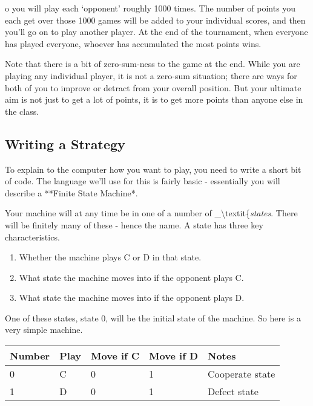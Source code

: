 \documentclass[
  11pt,
]{article}
\providecommand{\tightlist}{%
  \setlength{\itemsep}{0pt}\setlength{\parskip}{0pt}}
\begin{document}
o you will play each `opponent' roughly 1000 times. The number of points
you each get over those 1000 games will be added to your individual
scores, and then you'll go on to play another player. At the end of the
tournament, when everyone has played everyone, whoever has accumulated
the most points wins.

Note that there is a bit of zero-sum-ness to the game at the end. While
you are playing any individual player, it is not a zero-sum situation;
there are ways for both of you to improve or detract from your overall
position. But your ultimate aim is not just to get a lot of points, it
is to get more points than anyone else in the class.

\newpage

\hypertarget{writing-a-strategy}{%
\subsection{Writing a Strategy}\label{writing-a-strategy}}

To explain to the computer how you want to play, you need to write a
short bit of code. The language we'll use for this is fairly basic -
essentially you will describe a **Finite State Machine*.

Your machine will at any time be in one of a number of
\_\textbackslash textit\{\emph{states}. There will be finitely many of
these - hence the name. A state has three key characteristics.

\begin{enumerate}
\def\labelenumi{\arabic{enumi}.}
\tightlist
\item
  Whether the machine plays C or D in that state.
\item
  What state the machine moves into if the opponent plays C.
\item
  What state the machine moves into if the opponent plays D.
\end{enumerate}

One of these states, state 0, will be the initial state of the machine.
So here is a very simple machine.

\begin{longtable}[]{@{}lllll@{}}
\toprule
Number & Play & Move if C & Move if D & Notes \\
\midrule
\endhead
0 & C & 0 & 1 & Cooperate state \\
1 & D & 0 & 1 & Defect state \\
\bottomrule
\end{longtable}
\end{document}
